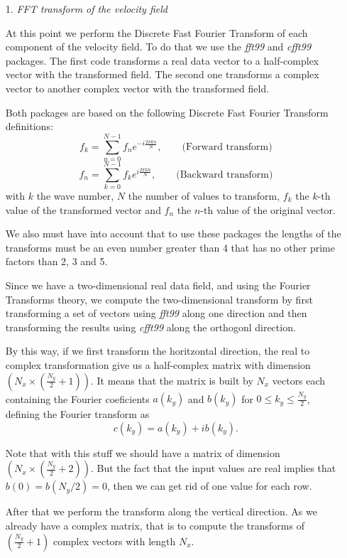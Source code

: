 \begin{itemize}
\item[1.]\textit{FFT transform of the velocity field}

At this point we perform the Discrete Fast Fourier Transform of each component of the velocity field. To do that we use the \textit{fft99} and \textit{cfft99} packages. The first code transforms a real data vector to a half-complex vector with the transformed field. The second one transforms a complex vector to another complex vector with the transformed field.

Both packages are based on the following Discrete Fast Fourier Transform definitions:
\begin{equation}
\label{1.12.1}
f_k=\sum_{n=0}^{N-1}f_ne^{-i\frac{2\pi kn}{N}},\quad\quad\mbox{(Forward transform)}
\end{equation}
\begin{equation}
\label{1.12.2}
f_n=\sum_{k=0}^{N-1}f_ke^{i\frac{2\pi kn}{N}},\quad\quad\mbox{(Backward transform)}
\end{equation}
with $k$ the wave number, $N$ the number of values to transform, $f_k$ the $k$-th value of the transformed vector and $f_n$ the $n$-th value of the original vector.

We also must have into account that to use these packages the lengths of the transforms must be an even number greater than 4 that has no other prime factors than 2, 3 and 5.

Since we have a two-dimensional real data field, and using the Fourier Transforms theory, we compute the two-dimensional transform by first transforming a set of vectors using \textit{fft99} along one direction and then transforming the results using \textit{cfft99} along the orthogonl direction.

By this way, if we first transform the horitzontal direction, the real to complex transformation give us a half-complex matrix with dimension $\left(N_x\times\left(\frac{N_y}{2}+1\right)\right)$. It means that the matrix is built by $N_x$ vectors each containing the Fourier coeficients $a(k_y)$ and $b(k_y)$ for $0\leq k_y\leq \frac{N_y}{2}$, defining the Fourier transform as
$$c(k_y)=a(k_y)+ib(k_y).$$

Note that with this stuff we should have a matrix of dimension $\left(N_x\times\left(\frac{N_y}{2}+2\right)\right)$. But the fact that the input values are real implies that $b(0)=b(N_y/2)=0$, then we can get rid of one value for each row.

After that we perform the transform along the vertical direction. As we already have a complex matrix, that is to compute the transforms of $\left(\frac{N_y}{2}+1\right)$ complex vectors with length $N_x$.


\end{itemize}
